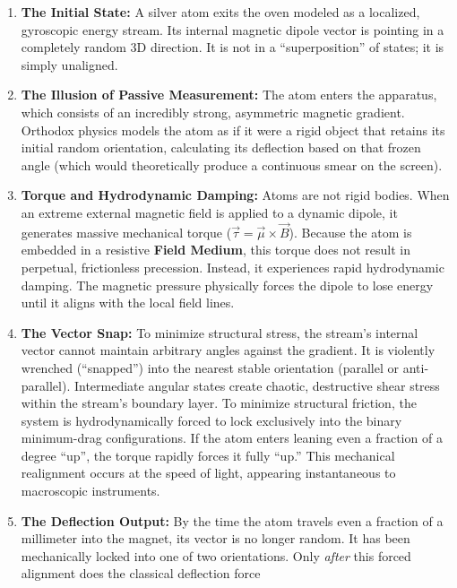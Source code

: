 \documentclass[
]{article}
\providecommand{\tightlist}{%
  \setlength{\itemsep}{0pt}\setlength{\parskip}{0pt}}
\begin{document}
\begin{enumerate}
\def\labelenumi{\arabic{enumi}.}
\tightlist
\item
  \textbf{The Initial State:} A silver atom exits the oven modeled as a
  localized, gyroscopic energy stream. Its internal magnetic dipole
  vector is pointing in a completely random 3D direction. It is not in a
  ``superposition'' of states; it is simply unaligned.
\item
  \textbf{The Illusion of Passive Measurement:} The atom enters the
  apparatus, which consists of an incredibly strong, asymmetric magnetic
  gradient. Orthodox physics models the atom as if it were a rigid
  object that retains its initial random orientation, calculating its
  deflection based on that frozen angle (which would theoretically
  produce a continuous smear on the screen).
\item
  \textbf{Torque and Hydrodynamic Damping:} Atoms are not rigid bodies.
  When an extreme external magnetic field is applied to a dynamic
  dipole, it generates massive mechanical torque
  (\(\vec{\tau} = \vec{\mu} \times \vec{B}\)). Because the atom is
  embedded in a resistive \textbf{Field Medium}, this torque does not
  result in perpetual, frictionless precession. Instead, it experiences
  rapid hydrodynamic damping. The magnetic pressure physically forces
  the dipole to lose energy until it aligns with the local field lines.
\item
  \textbf{The Vector Snap:} To minimize structural stress, the stream's
  internal vector cannot maintain arbitrary angles against the gradient.
  It is violently wrenched (``snapped'') into the nearest stable
  orientation (parallel or anti-parallel). Intermediate angular states
  create chaotic, destructive shear stress within the stream's boundary
  layer. To minimize structural friction, the system is hydrodynamically
  forced to lock exclusively into the binary minimum-drag
  configurations. If the atom enters leaning even a fraction of a degree
  ``up'', the torque rapidly forces it fully ``up.'' This mechanical
  realignment occurs at the speed of light, appearing instantaneous to
  macroscopic instruments.
\item
  \textbf{The Deflection Output:} By the time the atom travels even a
  fraction of a millimeter into the magnet, its vector is no longer
  random. It has been mechanically locked into one of two orientations.
  Only \emph{after} this forced alignment does the classical deflection
  force
\end{enumerate}
\end{document}
